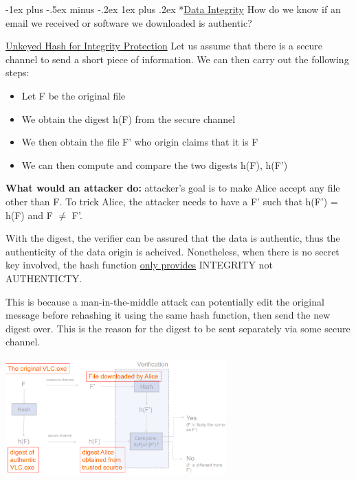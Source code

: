 \documentclass[10pt,landscape]{article}
\makeatletter
\renewcommand{\subsubsection}{\@startsection{subsubsection}{3}{0mm}%
                                {-1ex plus -.5ex minus -.2ex}%
                                {1ex plus .2ex}%
                                {\normalfont\small\bfseries}}
\makeatother
\begin{document}
\begin{multicols*}{3}
\subsubsection*{\underline{Data Integrity}}
How do we know if an email we received or software we downloaded is authentic?

\underline{Unkeyed Hash for Integrity Protection}
Let us assume that there is a secure channel to send a short piece of information. We can then carry out the following steps:
\begin{itemize}[noitemsep,wide=0pt, leftmargin=\dimexpr{} + 2\relax]
    \item Let F be the original file
    \item We obtain the digest h(F) from the secure channel
    \item We then obtain the file F' who origin claims that it is F
    \item We can then compute and compare the two digests h(F), h(F')
\end{itemize}

\textbf{What would an attacker do:} attacker's goal is to make Alice accept any file other than F. To trick Alice, 
the attacker needs to have a F' such that h(F') = h(F) and F $\ne$ F'. \newline

With the digest, the verifier can be assured that the data is authentic, thus the authenticity of the data origin is acheived.
Nonetheless, when there is no secret key involved, the hash function \underline{only provides} INTEGRITY not AUTHENTICTY.
\newline

This is because a man-in-the-middle attack can potentially edit the original message before rehashing it using the same hash function, then send the new digest over.
This is the reason for the digest to be sent separately via some secure channel.

\includegraphics*[height=4.5cm, width=8.5cm]{images/hashintegrityprotection.png}


\end{multicols*}
\end{document}
